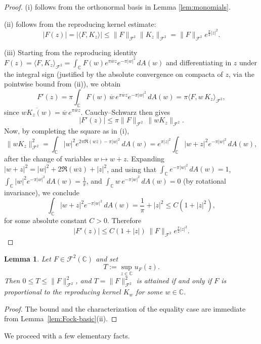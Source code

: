 \documentclass[a4paper,11pt,reqno]{amsart}
\numberwithin{equation}{section}
\theoremstyle{plain} %
\newtheorem{lemma}{Lemma}[section]
\theoremstyle{definition} %
\theoremstyle{remark}
\newcommand{\C}{\mathbb{C}}
\begin{document}
\begin{proof}
(i) follows from the orthonormal basis in Lemma \ref{lem:monomials}.

(ii) follows from the reproducing kernel estimate:
\[
|F(z)| = |\langle F, K_z \rangle|
\le \|F\|_{\mathcal{F}^2} \|K_z\|_{\mathcal{F}^2}
= \|F\|_{\mathcal{F}^2} e^{\frac{\pi}{2}|z|^2}.
\]

(iii) Starting from the reproducing identity
\(F(z)=\langle F,K_z\rangle_{\mathcal F^2}=\int_{\C}F(w)e^{\pi \overline{w}z}
e^{-\pi |w|^2}\,dA(w)\) and differentiating in \(z\) under the integral sign
(justified by the absolute convergence on compacta of \(z\), via the pointwise
bound from (ii)), we obtain
\[
F'(z)=\pi \int_{\C}F(w)\,\overline{w}\,e^{\pi\overline{w}z}e^{-\pi |w|^2}\,dA(w)
=\pi \langle F, w\,K_z\rangle_{\mathcal F^2},
\]
since \(\overline{wK_z(w)}=\overline{w}\,e^{\pi\overline{w}z}\). Cauchy--Schwarz
then gives
\[
|F'(z)|
\le
\pi \|F\|_{\mathcal F^2}\,\|wK_z\|_{\mathcal F^2}.
\]
Now, by completing the square as in (i),
\[
\|wK_z\|_{\mathcal F^2}^2
=
\int_{\C} |w|^2 e^{2\pi\Re(w\overline z)-\pi |w|^2}\,dA(w)
=
e^{\pi |z|^2}\int_{\C} |w+z|^2 e^{-\pi |w|^2}\,dA(w),
\]
after the change of variables \(w\mapsto w+z\). Expanding
\(|w+z|^2=|w|^2+2\Re(w\overline z)+|z|^2\), and using that
\(\int_\C e^{-\pi |w|^2}\,dA(w)=1\),
\(\int_\C |w|^2 e^{-\pi |w|^2}\,dA(w)=\frac{1}{\pi}\), and
\(\int_\C w\,e^{-\pi |w|^2}\,dA(w)=0\) (by rotational invariance), we conclude
\[
\int_{\C} |w+z|^2 e^{-\pi |w|^2}\,dA(w)
=
\frac{1}{\pi}+|z|^2
\le
C(1+|z|^2),
\]
for some absolute constant \(C>0\). Therefore
\[
|F'(z)| \le C(1+|z|)\,\|F\|_{\mathcal F^2}e^{\frac{\pi}{2}|z|^2}.
\]
\end{proof}

\medskip

\begin{lemma}\label{lem:max}
Let $F \in \mathcal{F}^2(\mathbb{C})$ and set
\[
T := \sup_{z \in \mathbb{C}} u_F(z).
\]
Then $0 \le T \le \|F\|_{\mathcal{F}^2}^2$, and $T = \|F\|_{\mathcal{F}^2}^2$
is attained if and only if $F$ is proportional to the reproducing kernel $K_w$
for some $w \in \mathbb{C}$.
\end{lemma}

\begin{proof}
The bound and the characterization of the equality case are immediate from
Lemma~\ref{lem:Fock-basic}(ii).
    \end{proof}

\medskip

    We proceed with a few elementary facts.
\end{document}
